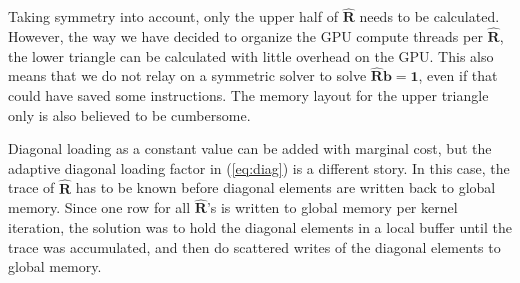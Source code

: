 \documentclass[journal]{IEEEtran}
\newcommand{\mat}[1]{\mathbf{#1}}
\renewcommand{\vec}[1]{\mathbf{#1}}
\begin{document}
Taking symmetry into account, only the upper half of $\mat{\hat{R}}$ needs to be calculated. However, the way we have decided to organize the GPU compute threads per $\mat{\hat{R}}$, the lower triangle can be calculated with little overhead on the GPU. This also means that we do not relay on a symmetric solver to solve $\mat{\hat{R}}\vec{b} = \vec{1}$, even if that could have saved some instructions. The memory layout for the upper triangle only is also believed to be cumbersome. 

Diagonal loading as a constant value can be added with marginal cost, but the adaptive diagonal loading factor in (\ref{eq:diag}) is a different story. In this case, the trace of $\mat{\hat{R}}$ has to be known before diagonal elements are written back to global memory. Since one row for all $\mat{\hat{R}}$'s is written to global memory per kernel iteration, the solution was to hold the diagonal elements in a local buffer until the trace was accumulated, and then do scattered writes of the diagonal elements to global memory. 





\end{document}
